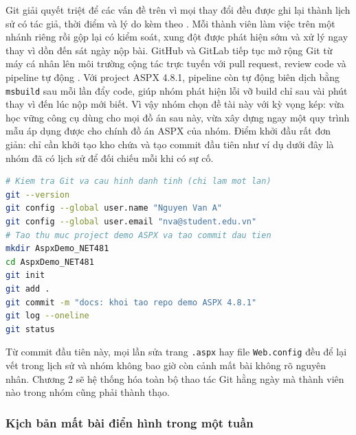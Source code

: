 Git giải quyết triệt để các vấn đề trên vì mọi thay đổi đều được ghi lại thành lịch sử có tác giả, thời điểm và lý do kèm theo \cite{atlassiangit}.
Mỗi thành viên làm việc trên một nhánh riêng rồi gộp lại có kiểm soát, xung đột được phát hiện sớm và xử lý ngay thay vì dồn đến sát ngày nộp bài.
GitHub và GitLab tiếp tục mở rộng Git từ máy cá nhân lên môi trường cộng tác trực tuyến với pull request, review code và pipeline tự động \cite{githubdocs, gitlabdocs}.
Với project ASPX 4.8.1, pipeline còn tự động biên dịch bằng \verb|msbuild| sau mỗi lần đẩy code, giúp nhóm phát hiện lỗi vỡ build chỉ sau vài phút thay vì đến lúc nộp mới biết.
Vì vậy nhóm chọn đề tài này với kỳ vọng kép: vừa học vững công cụ dùng cho mọi đồ án sau này, vừa xây dựng ngay một quy trình mẫu áp dụng được cho chính đồ án ASPX của nhóm.
Điểm khởi đầu rất đơn giản: chỉ cần khởi tạo kho chứa và tạo commit đầu tiên như ví dụ dưới đây là nhóm đã có lịch sử để đối chiếu mỗi khi có sự cố.
\begin{lstlisting}[language=bash]
# Kiem tra Git va cau hinh danh tinh (chi lam mot lan)
git --version
git config --global user.name "Nguyen Van A"
git config --global user.email "nva@student.edu.vn"
# Tao thu muc project demo ASPX va tao commit dau tien
mkdir AspxDemo_NET481
cd AspxDemo_NET481
git init
git add .
git commit -m "docs: khoi tao repo demo ASPX 4.8.1"
git log --oneline
git status
\end{lstlisting}
Từ commit đầu tiên này, mọi lần sửa trang \texttt{.aspx} hay file \texttt{Web.config} đều để lại vết trong lịch sử và nhóm không bao giờ còn cảnh mất bài không rõ nguyên nhân.
Chương 2 sẽ hệ thống hóa toàn bộ thao tác Git hằng ngày mà thành viên nào trong nhóm cũng phải thành thạo.

\subsubsection{Kịch bản mất bài điển hình trong một tuần}

